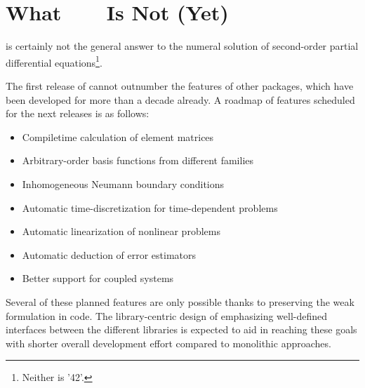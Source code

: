 \section*{What\ \ {\ViennaFEM}\ \ Is Not (Yet)}
{\ViennaFEM} is certainly not the general answer to the numeral solution of second-order partial differential equations\footnote{Neither is '42'.}.

The first release of {\ViennaFEM} cannot outnumber the features of other packages, which have been developed for more than a decade already.
A roadmap of features scheduled for the next releases is as follows:
\begin{itemize}
 \item Compiletime calculation of element matrices
 \item Arbitrary-order basis functions from different families
 \item Inhomogeneous Neumann boundary conditions
 \item Automatic time-discretization for time-dependent problems
 \item Automatic linearization of nonlinear problems
 \item Automatic deduction of error estimators
 \item Better support for coupled systems
\end{itemize}
Several of these planned features are only possible thanks to preserving the weak formulation in code.
The library-centric design of {\ViennaFEM} emphasizing well-defined interfaces between the different libraries is expected to aid in reaching these goals with shorter overall development effort compared to monolithic approaches.
